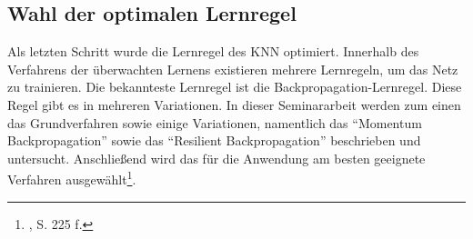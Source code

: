 \subsection{Wahl der optimalen Lernregel}
\label{subsection:Wahl der optimalen Lernregel}

Als letzten Schritt wurde die Lernregel des KNN optimiert. Innerhalb des Verfahrens der überwachten Lernens existieren mehrere Lernregeln, um das Netz zu trainieren. Die bekannteste Lernregel ist die Backpropagation-Lernregel. Diese Regel gibt es in mehreren Variationen. In dieser Seminararbeit werden zum einen das Grundverfahren sowie einige Variationen, namentlich das  "`Momentum Backpropagation"' sowie das "`Resilient Backpropagation"' beschrieben und untersucht. Anschließend wird das für die Anwendung am besten geeignete Verfahren ausgewählt\footnote{\Vgl{}, S. 225 f.}.

